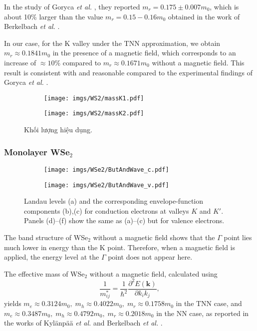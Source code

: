 \documentclass{article}
\begin{document}
In the study of Goryca \textit{et al.} \cite{goryca2019}, they reported $m_{r} = 0.175 \pm 0.007 m_{0}$, which is about 10\% larger than the value $m_{r} = 0.15 - 0.16 m_{0}$ obtained in the work of Berkelbach \textit{et al.} \cite{berkelbach2013}.  

In our case, for the K valley under the TNN approximation, we obtain $m_{r} \approx 0.1841 m_{0}$ in the presence of a magnetic field, which corresponds to an increase of $\approx 10\%$ compared to $m_{r} \approx 0.1671 m_{0}$ without a magnetic field. This result is consistent with and reasonable compared to the experimental findings of Goryca \textit{et al.} \cite{goryca2019}.  


\begin{figure}[htb]
	\begin{subfigure}{0.495\textwidth}
		\centering
		\texttt{[image: imgs/WS2/massK1.pdf]}
	\end{subfigure}
	\begin{subfigure}{0.495\textwidth}
		\centering
		\texttt{[image: imgs/WS2/massK2.pdf]}
	\end{subfigure}
	\caption{Khối lượng hiệu dụng.}
\end{figure}
\newpage
\subsubsection*{Monolayer WSe$_{2}$}
\begin{figure}[htb]
	\begin{subfigure}{0.495\textwidth}
		\centering
		\texttt{[image: imgs/WSe2/ButAndWave\_c.pdf]}
	\end{subfigure}
	\begin{subfigure}{0.495\textwidth}
		\centering
		\texttt{[image: imgs/WSe2/ButAndWave\_v.pdf]}
	\end{subfigure}
	\caption{Landau levels (a) and the corresponding envelope-function components (b),(c) for conduction electrons at valleys $K$ and $K'$. Panels (d)–(f) show the same as (a)–(c) but for valence electrons.}
\end{figure}
The band structure of WSe$_{2}$ without a magnetic field shows that the $\Gamma$ point lies much lower in energy than the K point. Therefore, when a magnetic field is applied, the energy level at the $\Gamma$ point does not appear here.  

The effective mass of WSe$_{2}$ without a magnetic field, calculated using
\[
\frac{1}{m_{ij}^{*}} = \frac{1}{\hbar^{2}} \frac{\partial^{2} E(\mathbf{k})}{\partial k_{i} k_{j}},
\]
yields $m_{e} \approx 0.3124 m_{0},\; m_{h} \approx 0.4022 m_{0},\; m_{r} \approx 0.1758 m_{0}$ in the TNN case, and $m_{e} \approx 0.3487 m_{0},\; m_{h} \approx 0.4792 m_{0},\; m_{r} \approx 0.2018 m_{0}$ in the NN case, as reported in the works of Kyl\"{a}np\"{a}\"{a} \textit{et al.} and Berkelbach \textit{et al.} \cite{kylanpaa2015,berkelbach2013}.  
\end{document}
